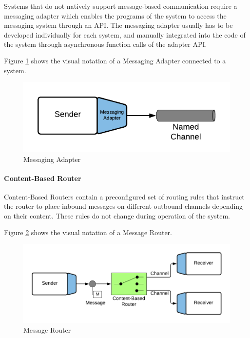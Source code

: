 Systems that do not natively support message-based communication require a messaging adapter which enables the programs of the system to access the messaging system through an API. The messaging adapter usually has to be developed individually for each system, and manually integrated into the code of the system through asynchronous function calls of the adapter API.

Figure \ref{messaging:adapter} shows the visual notation of a Messaging Adapter connected to a system.

\begin{figure}[H]
    \centering
    \includegraphics[scale=0.6]{Diagrams/Messaging/4. Messaging Adapter.pdf}
    \caption{Messaging Adapter}
    \label{messaging:adapter}
\end{figure}

\paragraph{Content-Based Router}

Content-Based Routers contain a preconfigured set of routing rules that instruct the router to place inbound messages on different outbound channels depending on their content. These rules do not change during operation of the system.

Figure \ref{messaging:router} shows the visual notation of a Message Router.

\begin{figure}[H]
    \centering
    \includegraphics[scale=0.6]{Diagrams/Messaging/5. Message Router.pdf}
    \caption{Message Router}
    \label{messaging:router}
\end{figure}

